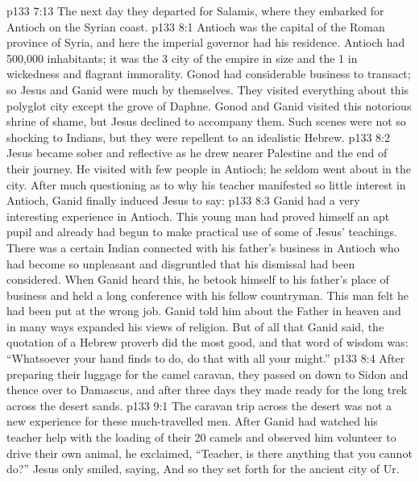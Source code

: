 \vs p133 7:13 \pc The next day they departed for Salamis, where they embarked for Antioch on the Syrian coast.
\vs p133 8:1 Antioch was the capital of the Roman province of Syria, and here the imperial governor had his residence. Antioch had 500,000 inhabitants; it was the 3 city of the empire in size and the 1 in wickedness and flagrant immorality. Gonod had considerable business to transact; so Jesus and Ganid were much by themselves. They visited everything about this polyglot city except the grove of Daphne. Gonod and Ganid visited this notorious shrine of shame, but Jesus declined to accompany them. Such scenes were not so shocking to Indians, but they were repellent to an idealistic Hebrew.
\vs p133 8:2 Jesus became sober and reflective as he drew nearer Palestine and the end of their journey. He visited with few people in Antioch; he seldom went about in the city. After much questioning as to why his teacher manifested so little interest in Antioch, Ganid finally induced Jesus to say: 
\vs p133 8:3 \pc Ganid had a very interesting experience in Antioch. This young man had proved himself an apt pupil and already had begun to make practical use of some of Jesus’ teachings. There was a certain Indian connected with his father’s business in Antioch who had become so unpleasant and disgruntled that his dismissal had been considered. When Ganid heard this, he betook himself to his father’s place of business and held a long conference with his fellow countryman. This man felt he had been put at the wrong job. Ganid told him about the Father in heaven and in many ways expanded his views of religion. But of all that Ganid said, the quotation of a Hebrew proverb did the most good, and that word of wisdom was: “Whatsoever your hand finds to do, do that with all your might.”
\vs p133 8:4 After preparing their luggage for the camel caravan, they passed on down to Sidon and thence over to Damascus, and after three days they made ready for the long trek across the desert sands.
\vs p133 9:1 The caravan trip across the desert was not a new experience for these much\hyp{}travelled men. After Ganid had watched his teacher help with the loading of their 20 camels and observed him volunteer to drive their own animal, he exclaimed, “Teacher, is there anything that you cannot do?” Jesus only smiled, saying,  And so they set forth for the ancient city of Ur.
